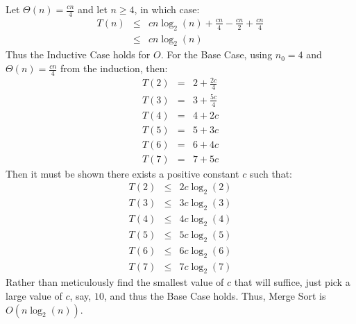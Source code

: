Let $\Theta(n) = \frac{cn}{4}$ and let $n \geq 4$, in which case:
\begin{eqnarray*}
	T(n) &\leq& cn\log_2(n) + \frac{cn}{4} - \frac{cn}{2} + \frac{cn}{4} \\
	 &\leq& cn\log_2(n)
\end{eqnarray*}
Thus the Inductive Case holds for $O$.  For the Base Case, using $n_0 = 4$ and $\Theta(n) = \frac{cn}{4}$ from the induction, then:
\begin{eqnarray*}
	T(2) &=& 2 + \frac{2c}{4} \\
	T(3) &=& 3 + \frac{5c}{4} \\
	T(4) &=& 4 + 2c \\
	T(5) &=& 5 + 3c \\
	T(6) &=& 6 + 4c \\
	T(7) &=& 7 + 5c
\end{eqnarray*}
Then it must be shown there exists a positive constant $c$ such that:
\begin{eqnarray*}
	T(2) &\leq& 2c\log_2(2) \\
	T(3) &\leq& 3c\log_2(3) \\
	T(4) &\leq& 4c\log_2(4) \\
	T(5) &\leq& 5c\log_2(5) \\
	T(6) &\leq& 6c\log_2(6) \\
	T(7) &\leq& 7c\log_2(7)
\end{eqnarray*}
Rather than meticulously find the smallest value of $c$ that will suffice, just pick a large value of $c$, say, $10$, and thus the Base Case holds.  Thus, Merge Sort is $O(n\log_2(n))$.

